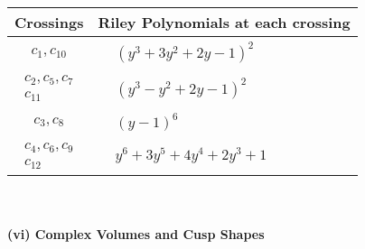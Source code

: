 \documentclass[1p]{elsarticle_modified}
\theoremstyle{definition}
\begin{document}
\begin{tabular}{m{50pt}|m{274pt}}
Crossings & \hspace{64pt}Riley Polynomials at each crossing \\
\hline $$\begin{aligned}c_{1},c_{10}\end{aligned}$$&$\begin{aligned}
&(y^3+3 y^2+2 y-1)^2
\end{aligned}$\\
\hline $$\begin{aligned}c_{2},c_{5},c_{7}\\c_{11}\end{aligned}$$&$\begin{aligned}
&(y^3- y^2+2 y-1)^2
\end{aligned}$\\
\hline $$\begin{aligned}c_{3},c_{8}\end{aligned}$$&$\begin{aligned}
&(y-1)^6
\end{aligned}$\\
\hline $$\begin{aligned}c_{4},c_{6},c_{9}\\c_{12}\end{aligned}$$&$\begin{aligned}
&y^6+3 y^5+4 y^4+2 y^3+1
\end{aligned}$\\
\hline
\end{tabular}\\~\\
\newpage\flushleft \textbf{(vi) Complex Volumes and Cusp Shapes}
\end{document}
